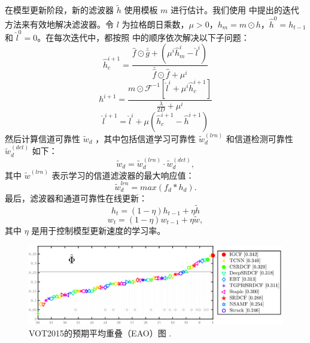 在模型更新阶段，新的滤波器 $\tilde{h}$ 使用模板 $m$ 进行估计。我们使用 \cite{Lukezic2017DiscriminativeCF} 中提出的迭代方法来有效地解决滤波器。令 $l$ 为拉格朗日乘数，$\mu > 0$，$h_m=m \odot h$，$\hat{h}^0 = h_{t-1}$ 和 $\hat{l}^0 = 0$。在每次迭代中，都按照 \cite{Lukezic2017DiscriminativeCF}中的顺序依次解决以下子问题：
\begin{equation} \label{eq:h1}
\hat{h}_c^{i+1} = \frac{\hat{f} \odot \bar{\hat{g}} +(\mu^i \hat{h}_m^i - \hat{l}^i)}{\bar{\hat{f}} \odot \hat f + \mu^i}
\end{equation}
\begin{equation}
h^{i+1} = \frac{m \odot \mathcal{F}^{-1}[\hat{l}^i + \mu^i\hat{h}_c^{i+1}]}{\frac{\lambda}{2D} + \mu^i}
\end{equation}
\begin{equation} \label{eq:h3}
\hat{l}^{i+1} = \hat{l}^i + \mu(\hat{h}_c^{i+1} - \hat{h}^{i+1})
\end{equation}
然后计算信道可靠性 $\tilde w_d$ \cite{Lukezic2017DiscriminativeCF} ，其中包括信道学习可靠性 $\tilde w_d^{(lrn)}$ 和信道检测可靠性 $\tilde w_d^{(det)}$ 如下： 
\begin{equation} \label{eq:c}
\tilde w_d = \tilde w_d^{(lrn)} \cdot \tilde w_d^{(det)},
\end{equation}
其中 $\tilde{w}^{(lrn)}$ 表示学习的信道滤波器的最大响应值：
\begin{equation} \label{eq:lrn}
\tilde{w}_d^{lrn} = max(f_d * h_d).
\end{equation}
最后，滤波器和通道可靠性在线更新：\begin{equation} \label{eq:update1}
h_t = (1 - \eta)h_{t-1} + \eta \tilde{h}
\end{equation}
\begin{equation} \label{eq:update2}
w_t = (1-\eta)w_{t-1} + \eta \tilde{w},
\end{equation}
其中 $\eta$ 是用于控制模型更新速度的学习率。

\begin{figure}
    \centering
    \includegraphics[width=1.0\textwidth]{Img/IGCF/vot/eao_rank_vot2015.png}
    \caption{VOT2015的预期平均重叠（EAO）图 \cite{Kristan2015TheVO}.}
    \label{fig:vot15}
\end{figure}

